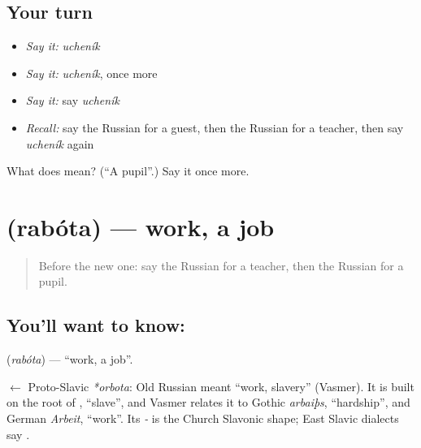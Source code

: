 \subsection*{Your turn}
\begin{itemize}
\raggedright
  \item \emph{Say it:} \emph{ucheník}
  \item \emph{Say it:} \emph{ucheník}, once more
  \item \emph{Say it:} say \emph{ucheník}
  \item \emph{Recall:} say the Russian for a guest, then the Russian for a teacher, then say \emph{ucheník} again
\end{itemize}

\begin{tcolorbox}[breakable,colback=teal!4,colframe=teal!35!black,title={Before you move on}]
What does  mean? (\textquotedblleft{}A pupil\textquotedblright{}.) Say it once more.
\end{tcolorbox}
\section[\texorpdfstring{\ru{работа} (rabóta)}{работа (rabóta)}]{ (rabóta) — work, a job}

\label{lesson:RU-C37-work}



\begin{quote}
Before the new one: say the Russian for a teacher, then the Russian for a pupil.
\end{quote}

\subsection*{You'll want to know: }
\textbf{} (\emph{rabóta}) — \textquotedblleft{}work, a job\textquotedblright{}.

\begin{cousinweb}
\textbf{} $\leftarrow$ Proto-Slavic \emph{*orbota}: Old Russian \emph{} meant \textquotedblleft{}work, slavery\textquotedblright{} (Vasmer). It is built on the root of \emph{}, \textquotedblleft{}slave\textquotedblright{}, and Vasmer relates it to Gothic \emph{arbaiþs}, \textquotedblleft{}hardship\textquotedblright{}, and German \emph{Arbeit}, \textquotedblleft{}work\textquotedblright{}. Its \emph{-} is the Church Slavonic shape; East Slavic dialects say \emph{}.
\end{cousinweb}

